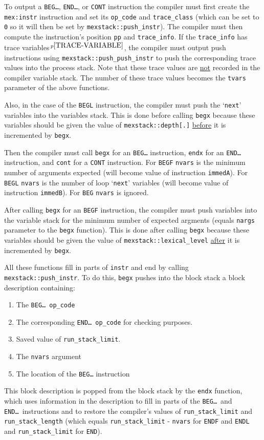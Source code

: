 \documentclass[12pt]{article}
\newcommand{\pagnote}[1]{$\,^{p\pageref{#1}}$}
\newcommand{\EOL}{\penalty \exhyphenpenalty}
\newenvironment{indpar}[1][0.3in]%
	{\begin{list}{}%
		     {\setlength{\itemsep}{0in}%
		      \setlength{\topsep}{0in}%
		      \setlength{\parsep}{1ex}%
		      \setlength{\labelwidth}{#1}%
		      \setlength{\leftmargin}{#1}%
		      \addtolength{\leftmargin}{\labelsep}}%
	 \item}%
	{\end{list}}
\begin{document}
\begin{indpar}
To output a {\tt BEG\ldots}, {\tt END\ldots}, or {\tt CONT} instruction
the compiler must first create the {\tt mex:instr} instruction and set
its {\tt op\_code} and {\tt trace\_class} (which can be set to {\tt 0}
so it will then be set by {\tt mexstack::push\_instr}).  The compiler must then
compute the instruction's position {\tt pp} and {\tt trace\_info}.
If the {\tt trace\_info} has
trace variables\pagnote{TRACE-VARIABLE}, the
compiler must output push instructions using
{\tt mexstack::\EOL push\_\EOL push\_\EOL instr}
to push the corresponding trace values into the process stack.
Note that these trace values are \underline{not} recorded in the
compiler variable stack.  The number of these trace values becomes
the {\tt tvars} parameter of the above functions.

Also, in the case of the {\tt BEGL} instruction, the compiler must
push the `{\tt next}' variables into the variables stack.
This is done before calling {\tt begx} because these variables should
be given the value of {\tt mexstack::depth[.]} \underline{before} it is
incremented by {\tt begx}.

Then the compiler must call {\tt begx} for an {\tt BEG\ldots} instruction,
{\tt endx} for an {\tt END\ldots} instruction, and {\tt cont} for
a {\tt CONT} instruction.  For {\tt BEGF} {\tt nvars} is the minimum number
of arguments expected (will become value of instruction {\tt immedA}).
For {\tt BEGL} {\tt nvars} is the number of loop `{\tt next}' variables
(will become value of instruction {\tt immedB}).  For {\tt BEG} {\tt nvars}
is ignored.

After calling {\tt begx} for an {\tt BEGF} instruction, the compiler
must push variables into the variable stack for the minimum number of
expected argments (equals {\tt nargs} parameter to the {\tt begx} function).
This is done after calling {\tt begx} because these variables should
be given the value of {\tt mexstack::lexical\_level} \underline{after} it is
incremented by {\tt begx}.

All these functions fill in parts of {\tt instr} and end by calling
{\tt mexstack::push\_instr}.  To do this, {\tt begx} pushes into the
block stack a block description containing:
\begin{enumerate}
\item The {\tt BEG\ldots}~{\tt op\_code}
\item The corresponding {\tt END\ldots}~{\tt op\_code} for checking purposes.
\item Saved value of {\tt run\_stack\_limit}.
\item The {\tt nvars} argument
\item The location of the {\tt BEG\ldots} instruction
\end{enumerate}
This block description is popped from the block stack by the {\tt endx}
function, which uses information in the description to fill in parts of the
{\tt BEG\ldots}~and {\tt END\ldots}~instructions and to restore the compiler's
values of {\tt run\_stack\_limit} and {\tt run\_stack\_length} (which equals
{\tt run\_stack\_limit} - {\tt nvars} for {\tt ENDF} and {\tt ENDL}
and {\tt run\_stack\_limit} for {\tt END}).


\end{indpar}
\end{document}
